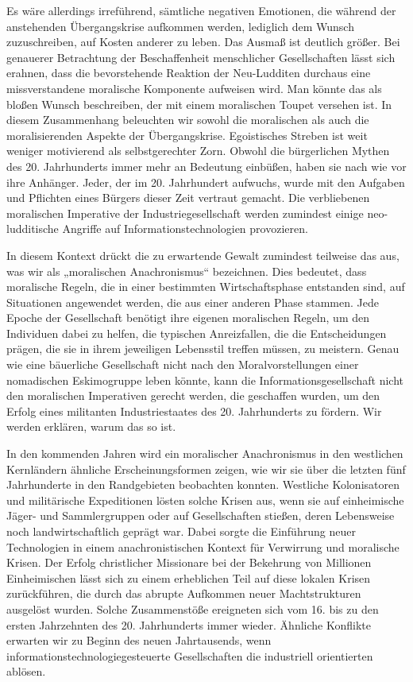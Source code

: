 \documentclass[
  a5paper,
  smalldemyvopaper,10pt,twoside,onecolumn,openright,extrafontsizes,hidelinks]{memoir}
\begin{document}
Es wäre allerdings irreführend, sämtliche negativen Emotionen, die
während der anstehenden Übergangskrise aufkommen werden, lediglich dem
Wunsch zuzuschreiben, auf Kosten anderer zu leben. Das Ausmaß ist
deutlich größer. Bei genauerer Betrachtung der Beschaffenheit
menschlicher Gesellschaften lässt sich erahnen, dass die bevorstehende
Reaktion der Neu-Ludditen durchaus eine missverstandene moralische
Komponente aufweisen wird. Man könnte das als bloßen Wunsch beschreiben,
der mit einem moralischen Toupet versehen ist. In diesem Zusammenhang
beleuchten wir sowohl die moralischen als auch die moralisierenden
Aspekte der Übergangskrise. Egoistisches Streben ist weit weniger
motivierend als selbstgerechter Zorn. Obwohl die bürgerlichen Mythen des
20. Jahrhunderts immer mehr an Bedeutung einbüßen, haben sie nach wie
vor ihre Anhänger. Jeder, der im 20. Jahrhundert aufwuchs, wurde mit den
Aufgaben und Pflichten eines Bürgers dieser Zeit vertraut gemacht. Die
verbliebenen moralischen Imperative der Industriegesellschaft werden
zumindest einige neo-ludditische Angriffe auf Informationstechnologien
provozieren.

In diesem Kontext drückt die zu erwartende Gewalt zumindest teilweise
das aus, was wir als „moralischen Anachronismus`` bezeichnen. Dies
bedeutet, dass moralische Regeln, die in einer bestimmten
Wirtschaftsphase entstanden sind, auf Situationen angewendet werden, die
aus einer anderen Phase stammen. Jede Epoche der Gesellschaft benötigt
ihre eigenen moralischen Regeln, um den Individuen dabei zu helfen, die
typischen Anreizfallen, die die Entscheidungen prägen, die sie in ihrem
jeweiligen Lebensstil treffen müssen, zu meistern. Genau wie eine
bäuerliche Gesellschaft nicht nach den Moralvorstellungen einer
nomadischen Eskimogruppe leben könnte, kann die Informationsgesellschaft
nicht den moralischen Imperativen gerecht werden, die geschaffen wurden,
um den Erfolg eines militanten Industriestaates des 20. Jahrhunderts zu
fördern. Wir werden erklären, warum das so ist.

In den kommenden Jahren wird ein moralischer Anachronismus in den
westlichen Kernländern ähnliche Erscheinungsformen zeigen, wie wir sie
über die letzten fünf Jahrhunderte in den Randgebieten beobachten
konnten. Westliche Kolonisatoren und militärische Expeditionen lösten
solche Krisen aus, wenn sie auf einheimische Jäger- und Sammlergruppen
oder auf Gesellschaften stießen, deren Lebensweise noch
landwirtschaftlich geprägt war. Dabei sorgte die Einführung neuer
Technologien in einem anachronistischen Kontext für Verwirrung und
moralische Krisen. Der Erfolg christlicher Missionare bei der Bekehrung
von Millionen Einheimischen lässt sich zu einem erheblichen Teil auf
diese lokalen Krisen zurückführen, die durch das abrupte Aufkommen neuer
Machtstrukturen ausgelöst wurden. Solche Zusammenstöße ereigneten sich
vom 16. bis zu den ersten Jahrzehnten des 20. Jahrhunderts immer wieder.
Ähnliche Konflikte erwarten wir zu Beginn des neuen Jahrtausends, wenn
informationstechnologiegesteuerte Gesellschaften die industriell
orientierten ablösen.
\end{document}
